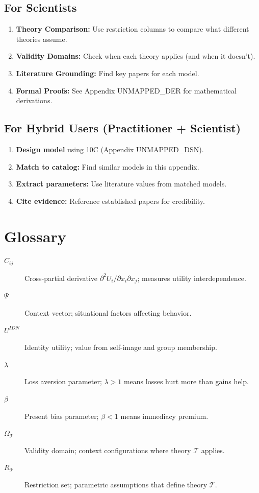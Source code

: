 \subsection{For Scientists}

\begin{enumerate}
    \item \textbf{Theory Comparison:} Use restriction columns to compare
          what different theories assume.
    \item \textbf{Validity Domains:} Check when each theory applies
          (and when it doesn't).
    \item \textbf{Literature Grounding:} Find key papers for each model.
    \item \textbf{Formal Proofs:} See Appendix UNMAPPED_DER for mathematical derivations.
\end{enumerate}

\subsection{For Hybrid Users (Practitioner + Scientist)}

\begin{enumerate}
    \item \textbf{Design model} using 10C (Appendix UNMAPPED_DSN).
    \item \textbf{Match to catalog:} Find similar models in this appendix.
    \item \textbf{Extract parameters:} Use literature values from matched models.
    \item \textbf{Cite evidence:} Reference established papers for credibility.
\end{enumerate}

\section{Glossary}
\label{sec:ms-glossary}

\begin{description}
    \item[$C_{ij}$] Cross-partial derivative $\partial^2 U_i / \partial x_i \partial x_j$;
                    measures utility interdependence.
    \item[$\Psi$] Context vector; situational factors affecting behavior.
    \item[$U^{IDN}$] Identity utility; value from self-image and group membership.
    \item[$\lambda$] Loss aversion parameter; $\lambda > 1$ means losses hurt more than gains help.
    \item[$\beta$] Present bias parameter; $\beta < 1$ means immediacy premium.
    \item[$\Omega_\mathcal{T}$] Validity domain; context configurations where theory $\mathcal{T}$ applies.
    \item[$R_\mathcal{T}$] Restriction set; parametric assumptions that define theory $\mathcal{T}$.
\end{description}

